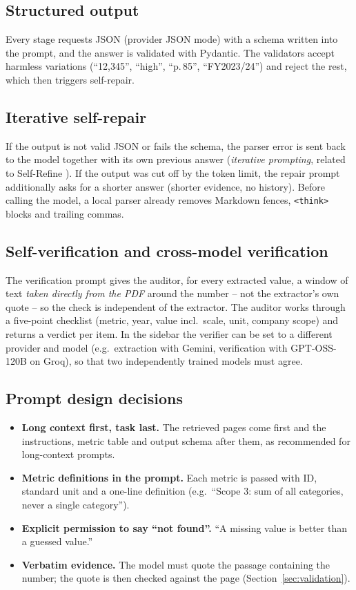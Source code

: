 \documentclass[11pt,a4paper]{article}
\newcommand{\code}[1]{\texttt{\small #1}}
\begin{document}
\subsection{Structured output}
Every stage requests JSON (provider JSON mode) with a schema written into the prompt, and the answer is
validated with Pydantic. The validators accept harmless variations (``12,345'', ``high'', ``p.\,85'',
``FY2023/24'') and reject the rest, which then triggers self-repair.

\subsection{Iterative self-repair}
If the output is not valid JSON or fails the schema, the parser error is sent back to the model together
with its own previous answer (\emph{iterative prompting}, related to Self-Refine \cite{selfrefine}).
If the output was cut off by the token limit, the repair prompt additionally asks for a shorter answer
(shorter evidence, no history). Before calling the model, a local parser already removes Markdown fences,
\code{<think>} blocks and trailing commas.

\subsection{Self-verification and cross-model verification}
The verification prompt gives the auditor, for every extracted value, a window of text \emph{taken directly
from the PDF} around the number -- not the extractor's own quote -- so the check is independent of the
extractor. The auditor works through a five-point checklist (metric, year, value incl.\ scale, unit,
company scope) and returns a verdict per item. In the sidebar the verifier can be set to a different provider
and model (e.g.\ extraction with Gemini, verification with GPT-OSS-120B on Groq), so that two independently
trained models must agree.

\subsection{Prompt design decisions}
\begin{itemize}
  \item \textbf{Long context first, task last.} The retrieved pages come first and the instructions, metric
        table and output schema after them, as recommended for long-context prompts.
  \item \textbf{Metric definitions in the prompt.} Each metric is passed with ID, standard unit and a one-line
        definition (e.g.\ ``Scope 3: sum of all categories, never a single category'').
  \item \textbf{Explicit permission to say ``not found''.} ``A missing value is better than a guessed value.''
  \item \textbf{Verbatim evidence.} The model must quote the passage containing the number; the quote is then
        checked against the page (Section~\ref{sec:validation}).
\end{itemize}
\end{document}
